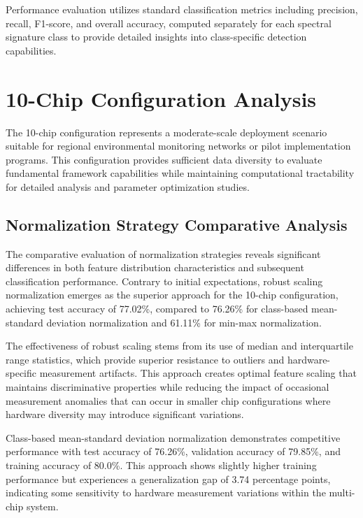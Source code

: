 Performance evaluation utilizes standard classification metrics including precision, recall, F1-score, and overall accuracy, computed separately for each spectral signature class to provide detailed insights into class-specific detection capabilities.

\section{10-Chip Configuration Analysis}
\label{sec:10chip_analysis}

The 10-chip configuration represents a moderate-scale deployment scenario suitable for regional environmental monitoring networks or pilot implementation programs. This configuration provides sufficient data diversity to evaluate fundamental framework capabilities while maintaining computational tractability for detailed analysis and parameter optimization studies.

\subsection{Normalization Strategy Comparative Analysis}

The comparative evaluation of normalization strategies reveals significant differences in both feature distribution characteristics and subsequent classification performance. Contrary to initial expectations, robust scaling normalization emerges as the superior approach for the 10-chip configuration, achieving test accuracy of 77.02\%, compared to 76.26\% for class-based mean-standard deviation normalization and 61.11\% for min-max normalization.

The effectiveness of robust scaling stems from its use of median and interquartile range statistics, which provide superior resistance to outliers and hardware-specific measurement artifacts. This approach creates optimal feature scaling that maintains discriminative properties while reducing the impact of occasional measurement anomalies that can occur in smaller chip configurations where hardware diversity may introduce significant variations.

Class-based mean-standard deviation normalization demonstrates competitive performance with test accuracy of 76.26\%, validation accuracy of 79.85\%, and training accuracy of 80.0\%. This approach shows slightly higher training performance but experiences a generalization gap of 3.74 percentage points, indicating some sensitivity to hardware measurement variations within the multi-chip system.

